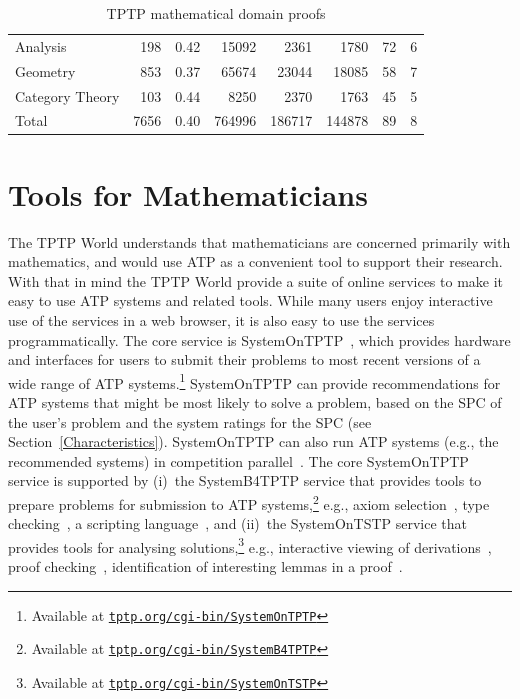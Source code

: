 \documentclass[runningheads]{llncs}
\begin{document}
\begin{table}[tb]
\begin{center}
\begin{tabular}{l|rr|rrrrr}
Analysis            &  198 & 0.42 &  15092 &  2361 &  1780 &   72 &     6 \\
Geometry            &  853 & 0.37 &  65674 & 23044 & 18085 &   58 &     7 \\
Category Theory     &  103 & 0.44 &   8250 &  2370 &  1763 &   45 &     5 \\
\hline
Total               & 7656 & 0.40 & 764996 &186717 &144878 &   89 &     8 \\
\end{tabular}
\end{center}
\caption{TPTP mathematical domain proofs}
\label{Proofs}
\end{table}

\section{Tools for Mathematicians}
\label{Tools}

The TPTP World understands that mathematicians are concerned primarily with mathematics, and would
use ATP as a convenient tool to support their research.
With that in mind the TPTP World provide a suite of online services to make it easy to use ATP
systems and related tools.
While many users enjoy interactive use of the services in a web browser, it is also easy to use 
the services programmatically.
The core service is SystemOnTPTP~\cite{Sut00-CADE-17}, which provides hardware and interfaces 
for users to submit their problems to most recent versions of a wide range of ATP 
systems.\footnote{%
Available at \href{https://tptp.org/cgi-bin/SystemOnTPTP}{{\tt tptp.org/cgi-bin/SystemOnTPTP}}}
SystemOnTPTP can provide recommendations for ATP systems that might be most likely to solve
a problem, based on the SPC of the user's problem and the system ratings for the SPC
(see Section~\ref{Characteristics}).
SystemOnTPTP can also run ATP systems (e.g., the recommended systems) in competition
parallel~\cite{SS99-FLAIRS}.
The core SystemOnTPTP service is supported by (i)~the SystemB4TPTP service that provides tools to
prepare problems for submission to ATP systems,\footnote{%
Available at \href{https://tptp.org/cgi-bin/SystemB4TPTP}{{\tt tptp.org/cgi-bin/SystemB4TPTP}}}
e.g., axiom selection~\cite{HV11}, type checking~\cite{KSR16}, a scripting language~\cite{Sut14}, 
and (ii)~the SystemOnTSTP service that provides tools for analysing solutions,\footnote{%
Available at \href{https://tptp.org/cgi-bin/SystemOnTSTP}{{\tt tptp.org/cgi-bin/SystemOnTSTP}}} 
e.g., interactive viewing of derivations~\cite{TPS07}, proof checking~\cite{Sut06}, identification 
of interesting lemmas in a proof~\cite{PGS06}.
\end{document}
